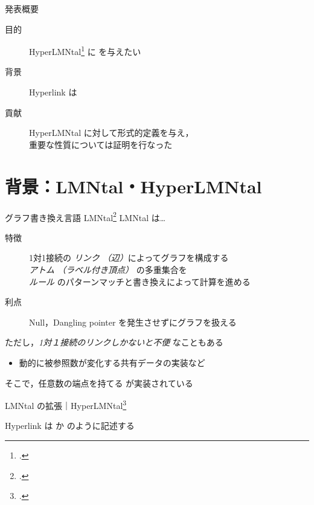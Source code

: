 \newcommand{\code}[1]{\fbox{\texttt{#1}}}

\begin{frame}{発表概要}
  \begin{description}
  \item[目的]
    HyperLMNtal\footcite{hyperlmntal} に  を与えたい
  \item[背景]
    Hyperlink は 
  \item[貢献]
    HyperLMNtal に対して形式的定義を与え，\\
    重要な性質については証明を行なった
  \end{description}
\end{frame}


\section[Background]{背景：LMNtal・HyperLMNtal}

\begin{frame}{グラフ書き換え言語 LMNtal\footcite{logiclmntal}}
  LMNtal は\dots
  \begin{description}
  \item[特徴]
    1対1接続の \emph{リンク \small （辺）}によってグラフを構成する\\
    \emph{アトム \small （ラベル付き頂点）} の多重集合を\\
    \emph{ルール} のパターンマッチと書き換えによって計算を進める
  \item[利点]
    Null，Dangling pointer を発生させずにグラフを扱える
  \end{description}

  ただし，\emph{1対１接続のリンクしかないと不便} なこともある
  \begin{itemize}
    \item 動的に被参照数が変化する共有データの実装など
  \end{itemize}

  そこで，任意数の端点を持てる  が実装されている
\end{frame}


\begin{frame}{LMNtal の拡張｜HyperLMNtal\footcite{hyperlmntal}}

  Hyperlink は \code{\$x} か \code{!X} のように記述する

  

\end{frame}



